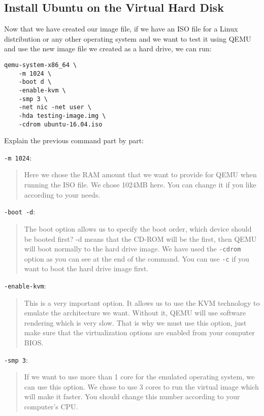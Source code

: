 \subsection{Install Ubuntu on the Virtual Hard Disk}

Now that we have created our image file, if we have an ISO file for a
Linux distribution or any other operating system and we want to test it
using QEMU and use the new image file we created as a hard drive, we can
run:

\begin{lstlisting}
qemu-system-x86_64 \
    -m 1024 \
    -boot d \
    -enable-kvm \
    -smp 3 \
    -net nic -net user \
    -hda testing-image.img \
    -cdrom ubuntu-16.04.iso
\end{lstlisting}

Explain the previous command part by part:

\texttt{-m\ 1024}:

\begin{quote}
Here we chose the RAM amount that we want to provide for QEMU when
running the ISO file. We chose 1024MB here. You can change it if you
like according to your needs.
\end{quote}

\texttt{-boot\ -d}:

\begin{quote}
The boot option allows us to specify the boot order, which device should
be booted first? -d means that the CD-ROM will be the first, then QEMU
will boot normally to the hard drive image. We have used the
\texttt{-cdrom} option as you can see at the end of the command. You can
use \texttt{-c} if you want to boot the hard drive image first.
\end{quote}

\texttt{-enable-kvm}:

\begin{quote}
This is a very important option. It allows us to use the KVM technology
to emulate the architecture we want. Without it, QEMU will use software
rendering which is very slow. That is why we must use this option, just
make sure that the virtualization options are enabled from your computer
BIOS.
\end{quote}

\texttt{-smp\ 3}:

\begin{quote}
If we want to use more than 1 core for the emulated operating system, we
can use this option. We chose to use 3 cores to run the virtual image
which will make it faster. You should change this number according to
your computer's CPU.
\end{quote}

